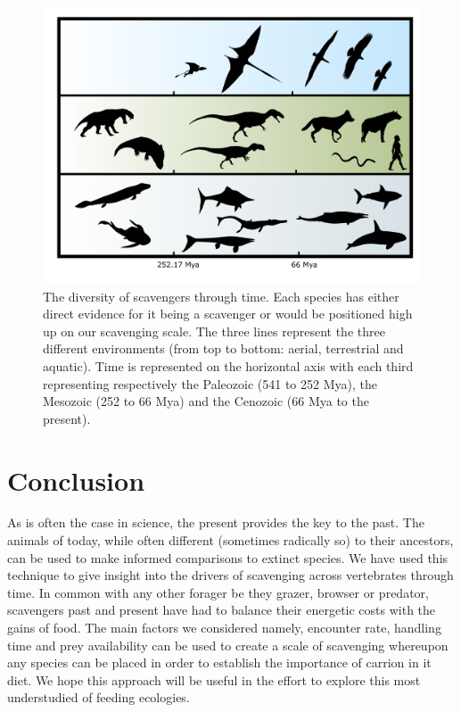 \documentclass[a4paper,12pt]{article}
\begin{document}
\begin{figure}[!htbp]
\centering
   \includegraphics[width=1\textwidth]{timeline_figure/timeLine.pdf}
\caption{The diversity of scavengers through time. Each species has either direct evidence for it being a scavenger or would be positioned high up on our scavenging scale. The three lines represent the three different environments (from top to bottom: aerial, terrestrial and aquatic). Time is represented on the horizontal axis with each third representing respectively the Paleozoic (541 to 252 Mya), the Mesozoic (252 to 66 Mya) and the Cenozoic (66 Mya to the present).}
\label{Timeline}
\end{figure}


\section*{Conclusion} 
As is often the case in science, the present provides the key to the past.
The animals of today, while often different (sometimes radically so) to their ancestors, can be used to make informed comparisons to extinct species. 
We have used this technique to give insight into the drivers of scavenging across vertebrates through time.
In common with any other forager be they grazer, browser or predator, scavengers past and present have had to balance their energetic costs with the gains of food. 
The main factors we considered namely, encounter rate, handling time and prey availability can be used to create a scale of scavenging whereupon any species can be placed in order to establish the importance of carrion in it diet.
We hope this approach will be useful in the effort to explore this most understudied of feeding ecologies. 
\end{document}
